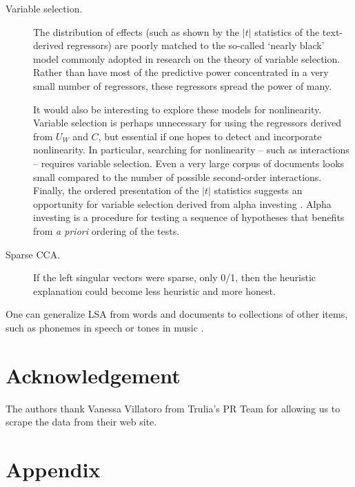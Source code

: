 \documentclass[12pt]{article}
\begin{document}
\begin{description}
   \item[Variable selection.]  The distribution of effects (such as shown by the $|t|$ statistics of the text-derived regressors) are poorly matched to the so-called `nearly black' model commonly adopted in research on the theory of variable selection.  Rather than have most of the predictive power concentrated in a very small number of regressors, these regressors spread the power of many.  
      
   It would also be interesting to explore these models for nonlinearity. Variable selection is perhaps unnecessary for using the regressors derived from $U_W$ and $C$, but essential if one hopes to detect and incorporate nonlinearity. In particular, searching for nonlinearity -- such as interactions -- requires variable selection.  Even a very large corpus of documents looks small compared to the number of possible second-order interactions.  Finally, the ordered presentation of the $|t|$ statistics suggests an opportunity for variable selection derived from alpha investing \citep{fosterstine08}.  Alpha investing is a procedure for testing a sequence of hypotheses that benefits from {\it a priori} ordering of the tests.
   
      \item[Sparse CCA.] If the left singular vectors were sparse, only 0/1, then the heuristic explanation could become less heuristic and more honest.

   \end{description}

One can generalize LSA from words and documents to collections of other items,
 such as phonemes in speech or tones in music \cite[called latent semantic
 mapping in][]{bellegarda05}.



\section*{Acknowledgement}

The authors thank Vanessa Villatoro from Trulia's PR Team for allowing us to scrape the data from their web site.

\section*{Appendix}
\end{document}
